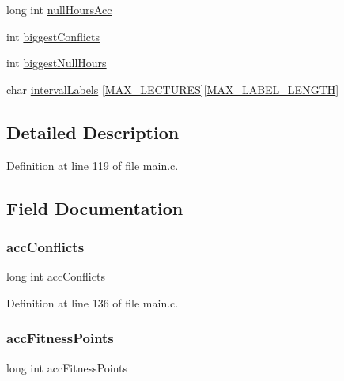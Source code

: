 \begin{DoxyCompactItemize}
\item 
long int \hyperlink{structparams_a7603f636641dd6762e9a1582394063f0}{null\+Hours\+Acc}
\item 
int \hyperlink{structparams_aeceaf128c1a93e23f79533ff51d9ebd9}{biggest\+Conflicts}
\item 
int \hyperlink{structparams_a9b6eb91317b38a72b50eced2b8fbbafc}{biggest\+Null\+Hours}
\item 
char \hyperlink{structparams_a0f99e938bd12ec5d93841fe380ed9e82}{interval\+Labels} \mbox{[}\hyperlink{main_8c_a152499a7a91751df0c7f203a60a88003}{M\+A\+X\+\_\+\+L\+E\+C\+T\+U\+R\+ES}\mbox{]}\mbox{[}\hyperlink{main_8c_a40953fb1d014188b77bbf6d21d0b3e6c}{M\+A\+X\+\_\+\+L\+A\+B\+E\+L\+\_\+\+L\+E\+N\+G\+TH}\mbox{]}
\end{DoxyCompactItemize}


\subsection{Detailed Description}


Definition at line 119 of file main.\+c.



\subsection{Field Documentation}
\hypertarget{structparams_a6d6078bdcb51ea92e024befc47fbe3b0}{}\label{structparams_a6d6078bdcb51ea92e024befc47fbe3b0} 
\subsubsection{\texorpdfstring{acc\+Conflicts}{accConflicts}}
{\footnotesize\ttfamily long int acc\+Conflicts}



Definition at line 136 of file main.\+c.

\hypertarget{structparams_aa9b36381502ef09962f85670e29a9b75}{}\label{structparams_aa9b36381502ef09962f85670e29a9b75} 
\subsubsection{\texorpdfstring{acc\+Fitness\+Points}{accFitnessPoints}}
{\footnotesize\ttfamily long int acc\+Fitness\+Points}



